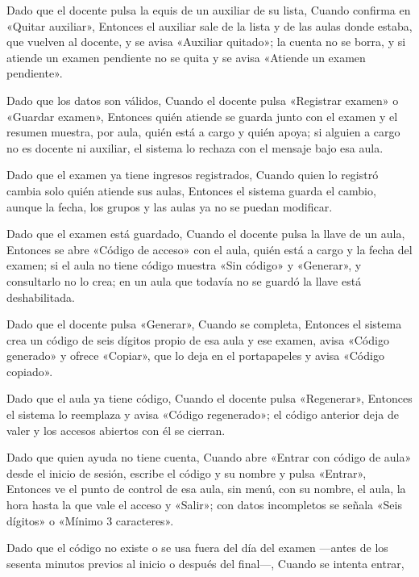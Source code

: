 {\item Dado que el docente pulsa la equis de un auxiliar de su lista, Cuando confirma en
      «Quitar auxiliar», Entonces el auxiliar sale de la lista y de las aulas donde
      estaba, que vuelven al docente, y se avisa «Auxiliar quitado»; la cuenta no se borra,
      y si atiende un examen pendiente no se quita y se avisa «Atiende un examen
      pendiente».
\item Dado que los datos son válidos, Cuando el docente pulsa «Registrar examen» o
      «Guardar examen», Entonces quién atiende se guarda junto con el examen y el resumen
      muestra, por aula, quién está a cargo y quién apoya; si alguien a cargo no es
      docente ni auxiliar, el sistema lo rechaza con el mensaje bajo esa aula.
\item Dado que el examen ya tiene ingresos registrados, Cuando quien lo registró cambia
      solo quién atiende sus aulas, Entonces el sistema guarda el cambio, aunque la fecha,
      los grupos y las aulas ya no se puedan modificar.
\item Dado que el examen está guardado, Cuando el docente pulsa la llave de un aula,
      Entonces se abre «Código de acceso» con el aula, quién está a cargo y la fecha del
      examen; si el aula no tiene código muestra «Sin código» y «Generar», y consultarlo
      no lo crea; en un aula que todavía no se guardó la llave está deshabilitada.
\item Dado que el docente pulsa «Generar», Cuando se completa, Entonces el sistema crea un
      código de seis dígitos propio de esa aula y ese examen, avisa «Código generado» y
      ofrece «Copiar», que lo deja en el portapapeles y avisa «Código copiado».
\item Dado que el aula ya tiene código, Cuando el docente pulsa «Regenerar», Entonces el
      sistema lo reemplaza y avisa «Código regenerado»; el código anterior deja de valer y
      los accesos abiertos con él se cierran.
\item Dado que quien ayuda no tiene cuenta, Cuando abre «Entrar con código de aula» desde
      el inicio de sesión, escribe el código y su nombre y pulsa «Entrar», Entonces ve el
      punto de control de esa aula, sin menú, con su nombre, el aula, la hora hasta la que
      vale el acceso y «Salir»; con datos incompletos se señala «Seis dígitos» o «Mínimo 3
      caracteres».
\item Dado que el código no existe o se usa fuera del día del examen ---antes de los
      sesenta minutos previos al inicio o después del final---, Cuando se intenta entrar,
}
